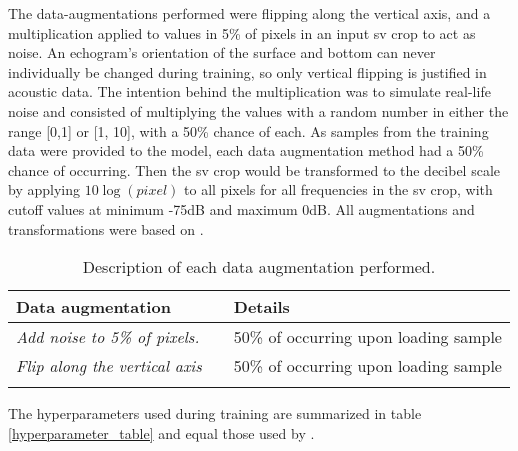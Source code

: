         The data-augmentations performed were flipping along the vertical axis, and a multiplication applied to values in 5\% of pixels in an input \gls{sv} crop to act as noise. An echogram’s orientation of the surface and bottom can never individually be changed during training, so only vertical flipping is justified in acoustic data. The intention behind the multiplication was to simulate real-life noise and consisted of multiplying the values with a random number in either the range [0,1] or [1, 10], with a 50\% chance of each.  As samples from the training data were provided to the model, each data augmentation method had a 50\% chance of occurring. Then the \gls{sv} crop would be transformed to the decibel scale by applying $10\log{(pixel)}$ to all pixels for all frequencies in the \gls{sv} crop, with cutoff values at minimum -75dB and maximum 0dB. All augmentations and transformations were based on \citeauthor{brautaset2020acoustic}\cite{brautaset2020acoustic}. 
        
        
        
        \begin{longtable}{lll}

            \caption[Data augmentation summary]{Description of each data augmentation performed.}
            \\\hline
            \multicolumn{2}{|l|}{\textbf{Data augmentation}} & \multicolumn{1}{l|}{\textbf{Details}} \\ \hline
            \endfirsthead
            \endhead
            \textit{Add noise to 5\% of pixels.}      &       & 50\% of occurring upon loading sample \\ \hline
            \textit{Flip along the vertical axis}        &       & 50\% of occurring upon loading sample \\ \hline

            \label{data_augmentation_table}
        \end{longtable}
        
        The hyperparameters used during training are summarized in table \ref{hyperparameter_table} and equal those used by \citeauthor{brautaset2020acoustic}\cite{brautaset2020acoustic}.

